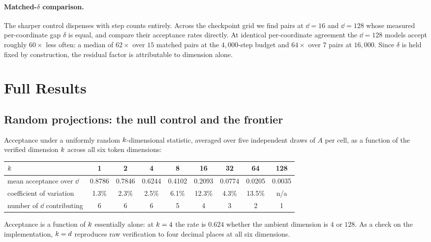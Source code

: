 \paragraph{Matched-$\delta$ comparison.} The sharper control dispenses with step counts entirely.
Across the checkpoint grid we find pairs at $\dd{=}16$ and $\dd{=}128$ whose measured per-coordinate
gap $\delta$ is equal, and compare their acceptance rates directly. At identical per-coordinate
agreement the $\dd{=}128$ models accept roughly $60\times$ less often: a median of $62\times$ over
$15$ matched pairs at the $4{,}000$-step budget and $64\times$ over $7$ pairs at $16{,}000$. Since
$\delta$ is held fixed by construction, the residual factor is attributable to dimension alone.

\section{Full Results}
\label{app:results}

\subsection{Random projections: the null control and the frontier}

Acceptance under a uniformly random $k$-dimensional statistic, averaged over five independent draws
of $A$ per cell, as a function of the verified dimension $k$ across all six token dimensions:

\begin{center}
\small
\begin{tabular}{lcccccccc}
\toprule
$k$ & 1 & 2 & 4 & 8 & 16 & 32 & 64 & 128 \\
\midrule
mean acceptance over $\dd$ & 0.8786 & 0.7846 & 0.6244 & 0.4102 & 0.2093 & 0.0774 & 0.0205 & 0.0035 \\
coefficient of variation & 1.3\% & 2.3\% & 2.5\% & 6.1\% & 12.3\% & 4.3\% & 13.5\% & n/a \\
number of $\dd$ contributing & 6 & 6 & 6 & 5 & 4 & 3 & 2 & 1 \\
\bottomrule
\end{tabular}
\end{center}

Acceptance is a function of $k$ essentially alone: at $k = 4$ the rate is $0.624$ whether the
ambient dimension is $4$ or $128$. As a check on the implementation, $k = d$ reproduces raw
verification to four decimal places at all six dimensions.

